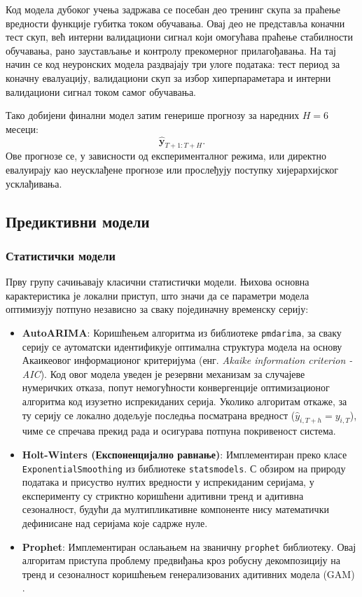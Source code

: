 \documentclass[12pt,oneside]{memoir}
\begin{document}
Код модела дубоког учења задржава се посебан део тренинг скупа за праћење вредности функције губитка током обучавања. Овај део не представља коначни тест скуп, већ интерни валидациони сигнал који омогућава праћење стабилности обучавања, рано заустављање и контролу прекомерног прилагођавања. На тај начин се код неуронских модела раздвајају три улоге података: тест период за коначну евалуацију, валидациони скуп за избор хиперпараметара и интерни валидациони сигнал током самог обучавања.

Тако добијени финални модел затим генерише прогнозу за наредних $H=6$ месеци:
\begin{equation}
    \hat{\mathbf{y}}_{T+1:T+H}.
\end{equation}
Ове прогнозе се, у зависности од експерименталног режима, или директно евалуирају као неусклађене прогнозе или прослеђују поступку хијерархијског усклађивања.

\subsection{Предиктивни модели}

\subsubsection{Статистички модели}

Прву групу сачињавају класични статистички модели. Њихова основна карактеристика је локални приступ, што значи да се параметри модела оптимизују потпуно независно за сваку појединачну временску серију:

\begin{itemize}
    \item \textbf{AutoARIMA}: Коришћењем алгоритма из библиотеке \texttt{pmdarima}, за сваку серију се аутоматски идентификује оптимална структура модела на основу Акаикеовог информационог критеријума (енг. \textit{Akaike information criterion - AIC}). Код овог модела уведен је резервни механизам за случајеве нумеричких отказа, попут немогућности конвергенције оптимизационог алгоритма код изузетно испрекиданих серија. Уколико алгоритам откаже, за ту серију се локално додељује последња посматрана вредност ($\hat{y}_{i,T+h} = y_{i,T}$), чиме се спречава прекид рада и осигурава потпуна покривеност система.
    
    \item \textbf{Holt-Winters (Експоненцијално равнање)}: Имплементиран преко класе \texttt{ExponentialSmoothing} из библиотеке \texttt{statsmodels}. С обзиром на природу података и присуство нултих вредности у испрекиданим серијама, у експерименту су стриктно коришћени адитивни тренд и адитивна сезоналност, будући да мултипликативне компоненте нису математички дефинисане над серијама које садрже нуле.
    
    \item \textbf{Prophet}: Имплементиран ослањањем на званичну \texttt{prophet} библиотеку. Овај алгоритам приступа проблему предвиђања кроз робусну декомпозицију на тренд и сезоналност коришћењем генерализованих адитивних модела (GAM) \cite{taylor2018forecasting}.
\end{itemize}
\end{document}
